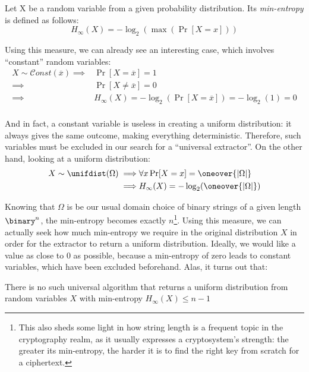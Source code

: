 \begin{definition} Let X be a random variable from a given probability distribution. Its \emph{min-entropy} is defined as follows:
\[
    H_{\infty}(X) = -\log_2(\max(\Pr[X = x]))
\]
\end{definition}

Using this measure, we can already see an interesting case, which involves ``constant'' random variables:
\begin{align*}
    X \sim \mathcal{C}onst(\overline{x}) \implies & \Pr[X = \overline{x}] = 1                                       \\
                                         \implies & \Pr[X \neq \overline{x}] = 0                                    \\
                                         \implies & H_{\infty}(X) = -\log_2(\Pr[X = \overline{x}]) = -\log_2(1) = 0 \\
\end{align*}

And in fact, a constant variable is useless in creating a uniform distribution: it always gives the same outcome, making everything deterministic. Therefore, such variables must be excluded in our search for a ``universal extractor''.
On the other hand, looking at a uniform distribution:
\begin{align*}
    X \sim \unifdist(\Omega) \implies & \forall x \Pr[X = x] = \oneover{|\Omega|}   \\
                             \implies & H_{\infty}(X) = -\log_2(\oneover{|\Omega|})
\end{align*}

Knowing that $\Omega$ is be our usual domain choice of binary strings of a given length $\binary^n$, the min-entropy becomes exactly $n$\footnote{This also sheds some light in how string length is a frequent topic in the cryptography realm, as it usually expresses a cryptosystem's strength: the greater its min-entropy, the harder it is to find the right key from scratch for a ciphertext.}.
Using this measure, we can actually seek how much min-entropy we require in the original distribution $X$ in order for the extractor to return a uniform distribution. Ideally, we would like a value as close to 0 as possible, because a min-entropy of zero leads to constant variables, which have been excluded beforehand. Alas, it turns out that:
\begin{claim}
    There is no such universal \ext{} algorithm that returns a uniform distribution from random variables $X$ with min-entropy $H_{\infty}(X) \leq n - 1$
\end{claim}

